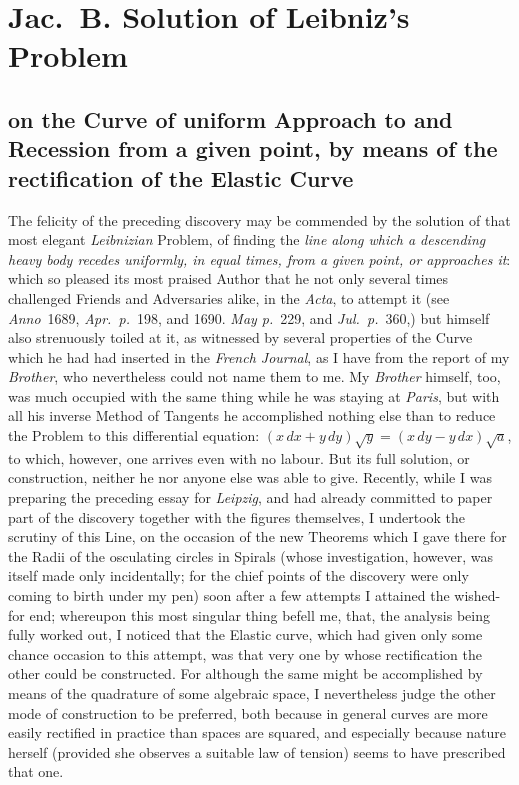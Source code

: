 \documentclass{article}
\begin{document}
\section*{Jac.\ B. Solution of Leibniz's Problem}
\subsection*{on the Curve of uniform Approach to and Recession from a given point, by means of the rectification of the Elastic Curve}

The felicity of the preceding discovery may be commended by the solution of that most elegant
\emph{Leibnizian} Problem, of finding the \emph{line along which a descending heavy body recedes
uniformly, in equal times, from a given point, or approaches it}: which so pleased its most
praised Author that he not only several times challenged Friends and Adversaries alike, in the
\emph{Acta}, to attempt it (see \emph{Anno}~1689, \emph{Apr.\ p.}~198, and 1690. \emph{May p.}~229,
and \emph{Jul.\ p.}~360,) but himself also strenuously toiled at it, as witnessed by several
properties of the Curve which he had had inserted in the \emph{French Journal}, as I have from the
report of my \emph{Brother}, who nevertheless could not name them to me. My \emph{Brother} himself,
too, was much occupied with the same thing while he was staying at \emph{Paris}, but with all his
inverse Method of Tangents he accomplished nothing else than to reduce the Problem to this
differential equation: $(x\,dx + y\,dy)\sqrt{y} = (x\,dy - y\,dx)\sqrt{a}$, to which, however,
one arrives even with no labour. But its full solution, or construction, neither he nor
anyone else was able to give. Recently, while I was preparing the preceding essay for
\emph{Leipzig}, and had already committed to paper part of the discovery together with the figures
themselves, I undertook the scrutiny of this Line, on the occasion of the new Theorems which I gave
there for the Radii of the osculating circles in Spirals (whose investigation, however, was itself
made only incidentally; for the chief points of the discovery were only coming to birth under my
pen) soon after a few attempts I attained the wished-for end; whereupon this most singular thing
befell me, that, the analysis being fully worked out, I noticed that the Elastic curve, which had
given only some chance occasion to this attempt, was that very one by whose rectification the other
could be constructed. For although the same might be accomplished by means of the quadrature of some
algebraic space, I nevertheless judge the other mode of construction to be preferred, both because
in general curves are more easily rectified in practice than spaces are squared, and especially
because nature herself (provided she observes a suitable law of tension) seems to have prescribed
that one.
\end{document}
